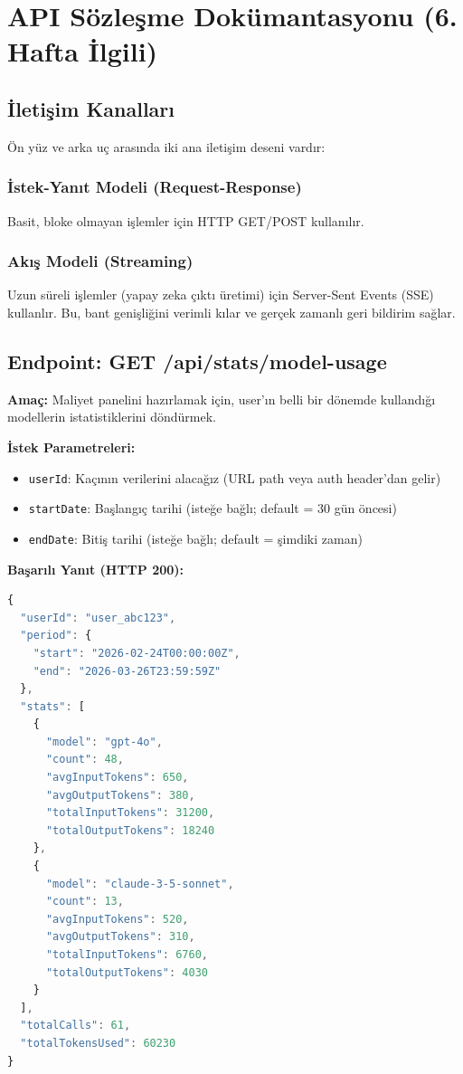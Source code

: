 \documentclass[12pt,a4paper]{article}
\begin{document}
\section{API Sözleşme Dokümantasyonu (6. Hafta İlgili)}

\subsection{İletişim Kanalları}

Ön yüz ve arka uç arasında iki ana iletişim deseni vardır:

\subsubsection{İstek-Yanıt Modeli (Request-Response)}
Basit, bloke olmayan işlemler için HTTP GET/POST kullanılır.

\subsubsection{Akış Modeli (Streaming)}
Uzun süreli işlemler (yapay zeka çıktı üretimi) için Server-Sent Events (SSE) kullanlır. Bu, bant genişliğini verimli kılar ve gerçek zamanlı geri bildirim sağlar.

\subsection{Endpoint: GET /api/stats/model-usage}

\textbf{Amaç:} Maliyet panelini hazırlamak için, user'ın belli bir dönemde kullandığı modellerin istatistiklerini döndürmek.

\textbf{İstek Parametreleri:}
\begin{itemize}[leftmargin=*]
  \item \texttt{userId}: Kaçının verilerini alacağız (URL path veya auth header'dan gelir)
  \item \texttt{startDate}: Başlangıç tarihi (isteğe bağlı; default = 30 gün öncesi)
  \item \texttt{endDate}: Bitiş tarihi (isteğe bağlı; default = şimdiki zaman)
\end{itemize}

\textbf{Başarılı Yanıt (HTTP 200):}
\begin{lstlisting}[language=JavaScript]
{
  "userId": "user_abc123",
  "period": {
    "start": "2026-02-24T00:00:00Z",
    "end": "2026-03-26T23:59:59Z"
  },
  "stats": [
    {
      "model": "gpt-4o",
      "count": 48,
      "avgInputTokens": 650,
      "avgOutputTokens": 380,
      "totalInputTokens": 31200,
      "totalOutputTokens": 18240
    },
    {
      "model": "claude-3-5-sonnet",
      "count": 13,
      "avgInputTokens": 520,
      "avgOutputTokens": 310,
      "totalInputTokens": 6760,
      "totalOutputTokens": 4030
    }
  ],
  "totalCalls": 61,
  "totalTokensUsed": 60230
}
\end{lstlisting}
\end{document}
